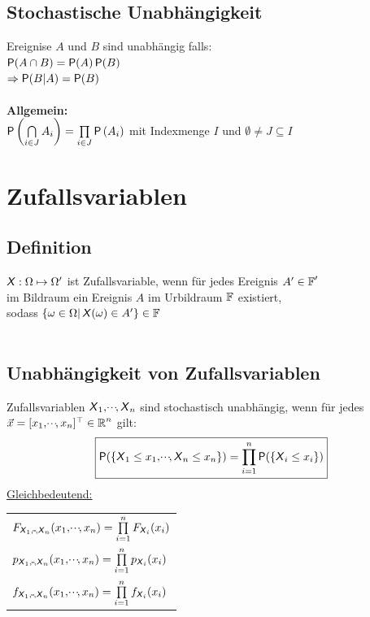 \documentclass[german,color,6pt]{latex4ei/latex4ei_sheet}
\begin{document}
\begin{sectionbox}
	\subsection{Stochastische Unabhängigkeit}
	Ereignise $A$ und $B$ sind unabhängig falls:\\
	$\P(A \cap B) = \P(A)\P(B)$ \\
	$\Rightarrow \P(B|A)=\P(B)$  \\ \\
	\textbf{Allgemein:}  \\ 
	$\P\left(\bigcap\limits_{i \in J} A_i\right) = \prod\limits_{i \in J}\P\left(A_i\right)$
	mit Indexmenge $I$ und $\emptyset \neq J \subseteq I$
\end{sectionbox}	


\section{Zufallsvariablen}
\begin{sectionbox}
	\subsection{Definition}
	$\X : \Omega \mapsto \Omega'$ ist Zufallsvariable, wenn für jedes Ereignis $A' \in \F'$  \\ 
	im Bildraum ein Ereignis $A$ im Urbildraum $\F$ existiert, \\ 
	sodass $\left\{\omega \in \Omega|\X(\omega) \in A'\right\} \in \F$\\ \\ 
\end{sectionbox}

\begin{sectionbox}
	\subsection{Unabhängigkeit von Zufallsvariablen}
	Zufallsvariablen $\X_1,\shdots,\X_n$ sind stochastisch unabhängig, wenn für jedes $\vec{x} = [x_1,\shdots,x_n]^\top \in \R^n$ gilt:
	\[\boxed{\P(\{\X_1 \leq x_1,\shdots,\X_n \leq x_n\}) = \prod\limits_{i=1}^{n}{\P(\{\X_i \leq x_i\})}}\]
	\underline{Gleichbedeutend:}\\
	\begin{tabular}{l}
		$F_{\X_1,\shdots,\X_n}(x_1,\shdots,x_n) = \prod\limits_{i=1}^{n}{F_{\X_i}(x_i)}$\\
		$p_{\X_1,\shdots,\X_n}(x_1,\shdots,x_n) = \prod\limits_{i=1}^{n}{p_{\X_i}(x_i)}$\\
		$f_{\X_1,\shdots,\X_n}(x_1,\shdots,x_n) = \prod\limits_{i=1}^{n}{f_{\X_i}(x_i)}$\\
	\end{tabular}
\end{sectionbox}
\end{document}
